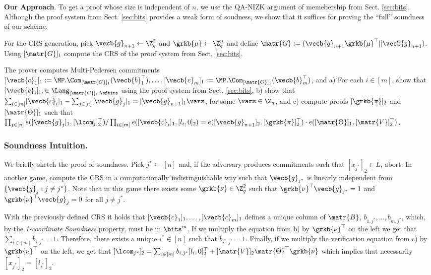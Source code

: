 \textbf{Our Approach}.
To get a proof whose size is independent of $n$, we use the QA-NIZK argument of memebership from Sect. \ref{sec:bits}. Although the proof system from Sect. \ref{sec:bits} provides a weak form of soudness, we show that it suffices for proving the ``full'' soundness of our scheme.

For the CRS generation, pick $\vecb{g}_{n+1}\gets\Z_q^{2}$ and $\grkb{\mu}\gets\Z_q^{n}$ and define $\matr{G}:=(\vecb{g}_{n+1}\grkb{\mu}^\top||\vecb{g}_{n+1})$. Using $[\matr{G}]_1$ compute the CRS of the proof system from Sect. \ref{sec:bits}.

The prover computes Multi-Pedersen commitments $[\vecb{c}_1]_1:=\MP.\Com_{[\matr{G}]_1}(\vecb{b}_1^\top),\ldots,[\vecb{c}_m]_1:=\MP.\Com_{[\matr{G}]_1}(\vecb{b}_{m}^\top)$, and a) For each $i\in[m]$, show that $[\vecb{c}_i]_1,\in\Lang_{[\matr{G}]_1,\sfbits}$ using the proof system from Sect. \ref{sec:bits}, b) show that $\sum_{i\in[m]}[\vecb{c}_i]_1-\sum_{j\in[n]}[\vecb{g}_j]_1=[\vecb{g}_{n+1}]_1\varz$, for some $\varz\in\Z_q$, and c)  compute proofs $[\grkb{\pi}]_2$
and $[\matr{\Theta}]_1$ such that $\prod_{j\in[n]}e([\vecb{g}_j]_1,[\lcom_j]_2^\top)/\prod_{i\in[m]}e([\vecb{c}_i]_1,[l_i, 0]_2)=e([\vecb{g}_{n+1}]_2,[\grkb{\pi}]_2^\top)\cdot e([\matr{\Theta}]_1,[\matr{V}]_2^\top)$.

\subsubsection{Soundness Intuition.}
We briefly sketch the proof of soundness. Pick $j^*\gets[n]$ and, if the adversary produces commitments such that $[x_{j^*}]_2\in L$, abort. In another game, compute the CRS in a computationally indistinguishable way such that $\vecb{g}_{j^*}$ is linearly independent from $\{\vecb{g}_{j}:j\neq j^*\}$. Note that in this game there exists some $\grkb{\nu}\in\Z_q^2$ such that $\grkb{\nu}^\top\vecb{g}_{j^*}=1$ and $\grkb{\nu}^\top\vecb{g}_{j}=0$ for all $j\neq j^*$.

With the previously defined CRS it holds that $[\vecb{c}_1]_1,\ldots,[\vecb{c}_m]_1$ defines a unique column of $\matr{B}$, $b_{1,j^*},\ldots,b_{m,j^*}$, which, by the \emph{1-coordinate Soundness} property, must be in $\bits^m$. If we multiply the equation from b) by $\grkb{\nu}^\top$ on the left we get that $\sum_{i\in[m]}b_{i,j^*}=1$. Therefore, there exists a unique $i^*\in[n]$ such that $b_{i^*,j^*}=1$. Finally, if we multiply the verification equation from c) by $\grkb{\nu}^\top$ on the left, we get that $[\lcom_{j^*}]_2 = \sum_{i\in[m]}b_{i,j^*}[l_i, 0]_2^\top+[\matr{V}]_2\matr{\Theta}^\top\grkb{\nu}$ which implies that necessarily $[x_{j^*}]_2 = [l_{i^*}]_2$.

